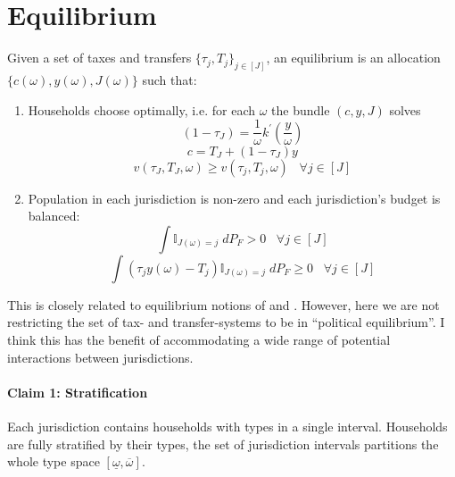 \documentclass[fleqn,10pt]{olplainarticle}
\begin{document}
\section*{Equilibrium}
Given a set of taxes and transfers $\{\tau_j, T_j\}_{j\in \left[J\right]}$, an equilibrium is an allocation $\{c(\omega), y(\omega), J(\omega)\}$ such that:
\begin{enumerate}
    \item Households choose optimally, i.e. for each $\omega$ the bundle $(c, y, J)$ solves 
            \begin{equation} \label{y_FOC}
                (1-\tau_J) = \frac{1}{\omega}k^\prime(\frac{y}{\omega})
            \end{equation}
            \begin{equation} \label{c_FOC}
                c = T_J + (1-\tau_J)y
            \end{equation}
            \begin{equation} \label{j_choice}
                v(\tau_J, T_J, \omega) \geq v(\tau_{j}, T_{j}, \omega)  \;\;\;\forall j \in \left[J\right]
            \end{equation}
    \item Population in each jurisdiction is non-zero and each jurisdiction's budget is balanced:
        \begin{equation} \label{positive_pop}
            \int\mathbb{I}_{J(\omega) = j} \;dP_F > 0 \;\;\;\forall j \in \left[J\right]
        \end{equation}
        \begin{equation} \label{budget_balance}
            \int\left(\tau_jy(\omega) - T_j\right) \mathbb{I}_{J(\omega) = j}  \;dP_F \geq 0 \;\;\;\forall j \in \left[J\right]
        \end{equation}
\end{enumerate}
This is closely related to equilibrium notions of \cite{EppleFilimonRomer1984} and \cite{EppleRomer1991}. However, here we are not restricting the set of tax- and transfer-systems to be in ``political equilibrium''. I think this has the benefit of accommodating a wide range of potential interactions between jurisdictions.

\paragraph{Claim 1: Stratification} Each jurisdiction contains households with types in a single interval. Households are fully stratified by their types, the set of jurisdiction intervals partitions the whole type space  $\left[\underline{\omega}, \overline{\omega}\right]$. \\
\end{document}
